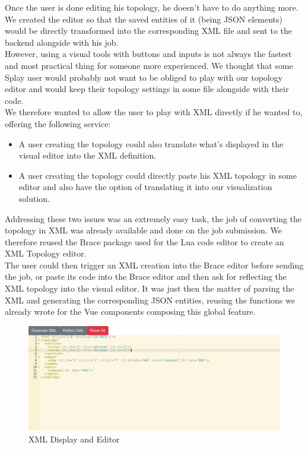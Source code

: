 \documentclass{eplmastersthesis}
\begin{document}
          Once the user is done editing his topology, he doesn't have to
          do anything more. We created the editor so that the saved entities
          of it (being JSON elements) would be directly transformed into the
          corresponding XML file and sent to the backend alongside with his
          job.\\

          However, using a visual tools with buttons and inputs is not always
          the fastest and most practical thing for someone more experienced. We
          thought that some Splay user would probably not want to be obliged
          to play with our topology editor and would keep their topology
          settings in some file alongside with their code.\\
          We therefore wanted to allow the user to play with XML directly
          if he wanted to, offering the following service:

          \begin{itemize}
            \item A user creating the topology could also translate what's
            displayed in the visual editor into the XML definition.
            \item A user creating the topology could directly paste
            his XML topology in some editor and also have the option of
            translating it into our visualization solution.
          \end{itemize}

          Addressing these two issues was an extremely easy task, the job of
          converting the topology in XML was already available and done on
          the job submission. We therefore reused the Brace package used
          for the Lua code editor to create an XML Topology editor.\\
          The user could then trigger an XML creation into the Brace editor
          before sending the job, or paste its code into the Brace editor and
          then ask for reflecting the XML topology into the visual editor. It
          was just then the matter of parsing the XML and generating the
          corresponding JSON entities, reusing the functions we already wrote
          for the Vue components composing this global feature.

          \begin{figure}[H]
            \centering
            \includegraphics[scale=0.5]{figures/xml_topology.png}
            \caption{\label{xml_topology} XML Display and Editor}
          \end{figure}
\end{document}
